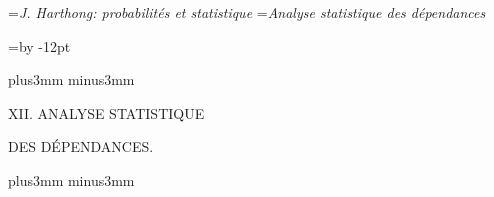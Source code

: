 


\auteurcourant={\sl J. Harthong: probabilit\'es et statistique}
\titrecourant={\sl Analyse statistique des d\'ependances}


\def\xx{\hskip-5pt + \hskip-5pt} 
\def\tv{\vrule height 30pt depth 6pt width0.4pt} 
\def\punkt{\vrule height0.4pt depth0pt width0.4pt} 
 
\newdimen\blocksize  \blocksize=\vsize  \advance\blocksize by -12pt 

\null\vskip11mm plus3mm minus3mm
 
\centerline{\tit XII. ANALYSE STATISTIQUE} 
\vskip7pt
\centerline{\tit DES D\'EPENDANCES.} 

\vskip11mm plus3mm minus3mm
 
